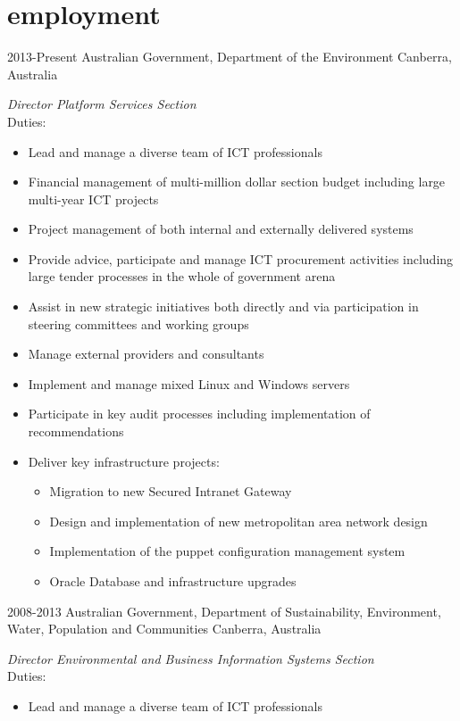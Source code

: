 \documentclass[]{friggeri-cv} %
\begin{document}
\section{employment}
\begin{entrylist}
\entry
{2013-Present}
{Australian Government, Department of the Environment}
{Canberra, Australia}
{\emph{Director Platform Services Section} \\
Duties:
\begin{itemize}
\item Lead and manage a diverse team of ICT professionals
\item Financial management of multi-million dollar section budget including large multi-year ICT projects
\item Project management of both internal and externally delivered systems
\item Provide advice, participate and manage ICT procurement activities including large tender processes in the whole of government arena
\item Assist in new strategic initiatives both directly and via participation in steering committees and working groups
\item Manage external providers and consultants
\item Implement and manage mixed Linux and Windows servers
\item Participate in key audit processes including implementation of recommendations
\item Deliver key infrastructure projects:
\begin{itemize}
\item Migration to new Secured Intranet Gateway
\item Design and implementation of new metropolitan area network design
\item Implementation of the puppet configuration management system
\item Oracle Database and infrastructure upgrades
\end{itemize}
\end{itemize}}
\entry
{2008-2013}
{Australian Government, Department of Sustainability, Environment, Water, Population and Communities}
{Canberra, Australia}
{\emph{Director Environmental and Business Information Systems Section} \\
Duties:
\begin{itemize}
\item Lead and manage a diverse team of ICT professionals

\end{itemize}}
\end{entrylist}
\end{document}
